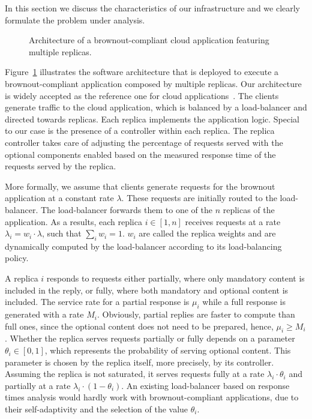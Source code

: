 In this section we discuss the characteristics of our infrastructure
and we clearly formulate the problem under analysis.

\begin{figure}[t]
  \centering 
   
  \caption{Architecture of a brownout-compliant cloud application
    featuring multiple replicas.}
  \label{fig:architecture}
\end{figure}

Figure~\ref{fig:architecture} illustrates the software architecture
that is deployed to execute a brownout-compliant application composed
by multiple replicas. Our architecture is widely accepted as the
reference one for cloud applications~\citep{Barroso09}. The clients
generate traffic to the cloud application, which is balanced by a
load-balancer and directed towards replicas. Each replica implements
the application logic. Special to our case is the presence of a
controller within each replica. The replica controller takes care of
adjusting the percentage of requests served with the optional
components enabled based on the measured response time of the requests
served by the replica.

More formally, we assume that clients generate requests for the
brownout application at a constant rate $\lambda$. These requests are
initially routed to the load-balancer. The load-balancer forwards them
to one of the $n$ replicas of the application. As a results, each
replica $i \in [1,n]$ receives requests at a rate $\lambda_i = w_i
\cdot \lambda$, such that $\sum_{i} w_i = 1$. $w_i$ are called the
replica weights and are dynamically computed by the load-balancer
according to its load-balancing policy.

A replica $i$ responds to requests either partially, where only
mandatory content is included in the reply, or fully, where both
mandatory and optional content is included. The service rate for a
partial response is $\mu_i$ while a full response is generated with a
rate $M_i$. Obviously, partial replies are faster to compute than full
ones, since the optional content does not need to be prepared, hence,
$\mu_i \geq M_i$. Whether the replica serves requests partially or
fully depends on a parameter $\theta_i \in [0, 1]$, which represents
the probability of serving optional content. This parameter is chosen
by the replica itself, more precisely, by its controller. Assuming the
replica is not saturated, it serves requests fully at a rate
$\lambda_i \cdot \theta_i$ and partially at a rate $\lambda_i \cdot
(1-\theta_i)$. An existing load-balancer based on response times
analysis would hardly work with brownout-compliant applications, due
to their self-adaptivity and the selection of the value $\theta_i$.

